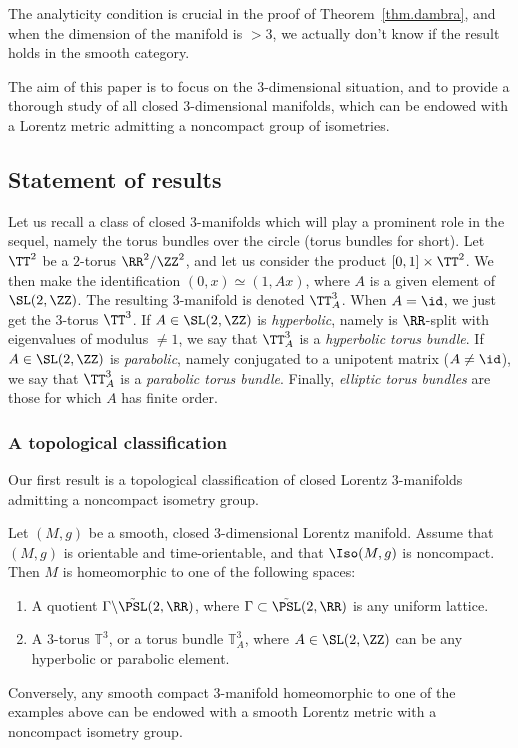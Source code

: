The analyticity condition is crucial in the proof of Theorem~\ref{thm.dambra}, and when the dimension of the manifold is $> 3$, we actually don't know if the result holds in the smooth category.


The aim of this paper is to focus on the $3$-dimensional situation, and to provide a thorough study of all closed $3$-dimensional manifolds, which can be endowed with a Lorentz metric admitting a noncompact group of isometries.

\subsection{Statement of results}

Let us recall a class of closed $3$-manifolds which will play a prominent role in the sequel, namely the torus bundles over the circle (torus bundles for short). Let $\TT^2$ be a $2$-torus $ \RR^2/ \ZZ^2 $, and let us consider the product $[0,1] \times \TT^2$. We then make the identification $(0,x) \simeq (1,Ax)$, where $A$ is a given element of $ \SL(2,\ZZ)$. The resulting $3$-manifold is denoted $\TT_A^3$. When $A= \id$, we just get the $3$-torus $\TT^3$. If $A \in \SL(2,\ZZ)$ is \emph{hyperbolic}, namely is $\RR$-split with eigenvalues of modulus $\not =1$, we say that $\TT_A^3$ is a \emph{hyperbolic torus bundle}. If $A \in \SL(2,\ZZ)$ is \emph{parabolic}, namely conjugated to a unipotent matrix ($A \not =\id$), we say that $\TT_A^3$ is a \emph{parabolic torus bundle}. Finally, \emph{elliptic torus bundles} are those for which $A$ has finite order.

\subsubsection{A topological classification} Our first result is a topological classification of closed Lorentz $3$-manifolds admitting a noncompact isometry group.

\begin{thmx}\label{thm.topological}
Let $(M,g)$ be a smooth, closed $3$-dimensional Lorentz manifold. Assume that $(M,g)$ is orientable and time-orientable, and that $\Iso(M,g)$ is noncompact. Then $M$ is homeomorphic to one of the following spaces:
\begin{enumerate}
\item \label{list1.1} A quotient $\Gamma \backslash \tilde{\PSL}(2,\RR)$, where $\Gamma \subset \tilde{\PSL}(2,\RR)$ is any uniform lattice.
\item \label{list1.2}A $3$-torus ${\mathbb T}^3$, or a torus bundle ${\mathbb T}_A^3$, where $A \in \SL(2,\ZZ)$ can be any hyperbolic or parabolic element. 
\end{enumerate}
Conversely, any smooth compact $3$-manifold homeomorphic to one of the examples above can be endowed with a smooth Lorentz metric with a noncompact isometry group.
\end{thmx}

